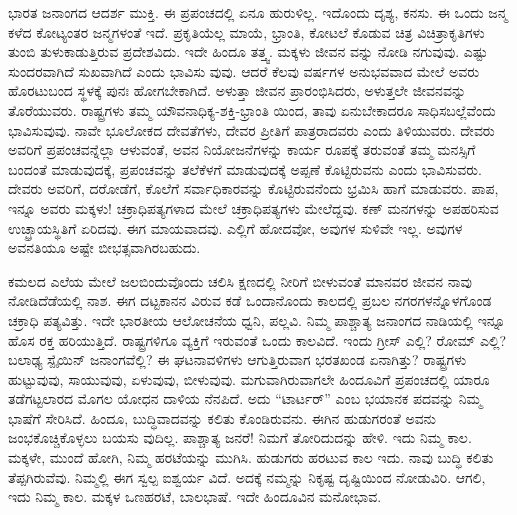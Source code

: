 ಭಾರತ ಜನಾಂಗದ ಆದರ್ಶ ಮುಕ್ತಿ. ಈ ಪ್ರಪಂಚದಲ್ಲಿ ಏನೂ ಹುರುಳಿಲ್ಲ. ಇದೊಂದು ದೃಶ್ಯ, ಕನಸು. ಈ ಒಂದು ಜನ್ಮ ಕಳೆದ ಕೋಟ್ಯಂತರ ಜನ್ಮಗಳಂತೆ ಇದೆ. ಪ್ರಕೃತಿಯೆಲ್ಲ ಮಾಯೆ, ಭ್ರಾಂತಿ, ಕೋಟಲೆ ಕೊಡುವ ಚಿತ್ರ ವಿಚಿತ್ರಾಕೃತಿಗಳು ತುಂಬಿ ತುಳುಕಾಡುತ್ತಿರುವ ಪ್ರದೇಶವಿದು. ಇದೇ ಹಿಂದೂ ತತ್ತ್ವ. ಮಕ್ಕಳು ಜೀವನ ವನ್ನು ನೋಡಿ ನಗುವುವು. ಎಷ್ಟು ಸುಂದರವಾಗಿದೆ ಸುಖವಾಗಿದೆ ಎಂದು ಭಾವಿಸು ವುವು. ಆದರೆ ಕೆಲವು ವರ್ಷಗಳ ಅನುಭವವಾದ ಮೇಲೆ ಅವರು ಹೊರಟುಬಂದ ಸ್ಥಳಕ್ಕೆ ಪುನಃ ಹೋಗಬೇಕಾಗಿದೆ. ಅಳುತ್ತಾ ಜೀವನ ಪ್ರಾರಂಭಿಸಿದರು, ಅಳುತ್ತಲೇ ಜೀವನವನ್ನು ತೊರೆಯುವರು. ರಾಷ್ಟ್ರಗಳು ತಮ್ಮ ಯೌವನಾಧಿಕ್ಯ-ಶಕ್ತಿ-ಭ್ರಾಂತಿ ಯಿಂದ, ತಾವು ಏನುಬೇಕಾದರೂ ಸಾಧಿಸಬಲ್ಲೆವೆಂದು ಭಾವಿಸುವುವು. ನಾವೇ ಭೂಲೋಕದ ದೇವತೆಗಳು, ದೇವರ ಪ್ರೀತಿಗೆ ಪಾತ್ರರಾದವರು ಎಂದು ತಿಳಿಯುವರು. ದೇವರು ಅವರಿಗೆ ಪ್ರಪಂಚವನ್ನೆಲ್ಲಾ ಆಳುವಂತೆ, ಅವನ ನಿಯೋಜನೆಗಳನ್ನು ಕಾರ್ಯ ರೂಪಕ್ಕೆ ತರುವಂತೆ ತಮ್ಮ ಮನಸ್ಸಿಗೆ ಬಂದಂತೆ ಮಾಡುವುದಕ್ಕೆ, ಪ್ರಪಂಚವನ್ನು ತಲೆಕೆಳಗೆ ಮಾಡುವುದಕ್ಕೆ ಅಪ್ಪಣೆ ಕೊಟ್ಟಿರುವನು ಎಂದು ಭಾವಿಸುವರು. ದೇವರು ಅವರಿಗೆ, ದರೋಡೆಗೆ, ಕೊಲೆಗೆ ಸರ್ವಾಧಿಕಾರವನ್ನು ಕೊಟ್ಟಿರುವನೆಂದು ಭ್ರಮಿಸಿ ಹಾಗೆ ಮಾಡುವರು. ಪಾಪ, ಇನ್ನೂ ಅವರು ಮಕ್ಕಳು! ಚಕ್ರಾಧಿಪತ್ಯಗಳಾದ ಮೇಲೆ ಚಕ್ರಾಧಿಪತ್ಯಗಳು ಮೇಲೆದ್ದವು. ಕಣ್​ ಮನಗಳನ್ನು ಅಪಹರಿಸುವ ಉಚ್ಛ್ರಾಯಸ್ಥಿತಿಗೆ ಏರಿದವು. ಈಗ ಮಾಯವಾದವು. ಎಲ್ಲಿಗೆ ಹೋದವೋ, ಅವುಗಳ ಸುಳಿವೇ ಇಲ್ಲ. ಅವುಗಳ ಅವನತಿಯೂ ಅಷ್ಟೇ ಬೀಭತ್ಸವಾಗಿರಬಹುದು.

ಕಮಲದ ಎಲೆಯ ಮೇಲೆ ಜಲಬಿಂದುವೊಂದು ಚಲಿಸಿ ಕ್ಷಣದಲ್ಲಿ ನೀರಿಗೆ ಬೀಳುವಂತೆ ಮಾನವರ ಜೀವನ ನಾವು ನೋಡಿದೆಡೆಯಲ್ಲಿ ನಾಶ. ಈಗ ದಟ್ಟಕಾನನ ವಿರುವ ಕಡೆ ಒಂದಾನೊಂದು ಕಾಲದಲ್ಲಿ ಪ್ರಬಲ ನಗರಗಳನ್ನೊಳಗೊಂಡ ಚಕ್ರಾಧಿ ಪತ್ಯವಿತ್ತು. ಇದೇ ಭಾರತೀಯ ಆಲೋಚನೆಯ ಧ್ವನಿ, ಪಲ್ಲವಿ. ನಿಮ್ಮ ಪಾಶ್ಚಾತ್ಯ ಜನಾಂಗದ ನಾಡಿಯಲ್ಲಿ ಇನ್ನೂ ಹೊಸ ರಕ್ತ ಹರಿಯುತ್ತಿದೆ. ರಾಷ್ಟ್ರಗಳಿಗೂ ವ್ಯಕ್ತಿಗೆ ಇರುವಂತೆ ಒಂದು ಕಾಲವಿದೆ. ಇಂದು ಗ್ರೀಸ್​ ಎಲ್ಲಿ? ರೋಮ್​ ಎಲ್ಲಿ? ಬಲಾಢ್ಯ ಸ್ಪೈಯಿನ್​ ಜನಾಂಗವೆಲ್ಲಿ? ಈ ಘಟನಾವಳಿಗಳು ಆಗುತ್ತಿರುವಾಗ ಭರತಖಂಡ ಏನಾಗಿತ್ತು? ರಾಷ್ಟ್ರಗಳು ಹುಟ್ಟುವುವು, ಸಾಯುವುವು, ಏಳುವುವು, ಬೀಳುವುವು. ಮಗುವಾಗಿರುವಾಗಲೇ ಹಿಂದೂವಿಗೆ ಪ್ರಪಂಚದಲ್ಲಿ ಯಾರೂ ತಡೆಗಟ್ಟಲಾರದ ಮೊಗಲ ಯೋಧನ ದಾಳಿಯ ನೆನಪಿದೆ. ಅದು “ಟಾರ್ಟರ್​” ಎಂಬ ಭಯಾನಕ ಪದವನ್ನು ನಿಮ್ಮ ಭಾಷೆಗೆ ಸೇರಿಸಿದೆ. ಹಿಂದೂ, ಬುದ್ಧಿವಾದವನ್ನು ಕಲಿತು ಕೊಂಡಿರುವನು. ಈಗಿನ ಹುಡುಗರಂತೆ ಅವನು ಜಂಭಕೊಚ್ಚಿಕೊಳ್ಳಲು ಬಯಸು ವುದಿಲ್ಲ. ಪಾಶ್ಚಾತ್ಯ ಜನರೆ! ನಿಮಗೆ ತೋರಿದುದನ್ನು ಹೇಳಿ. ಇದು ನಿಮ್ಮ ಕಾಲ. ಮಕ್ಕಳೇ, ಮುಂದೆ ಹೋಗಿ, ನಿಮ್ಮ ಹರಟೆಯನ್ನು ಮುಗಿಸಿ. ಹುಡುಗರು ಹರಟುವ ಕಾಲ ಇದು. ನಾವು ಬುದ್ಧಿ ಕಲಿತು ತೆಪ್ಪಗಿರುವೆವು. ನಿಮ್ಮಲ್ಲಿ ಈಗ ಸ್ವಲ್ಪ ಐಶ್ವರ್ಯ ವಿದೆ. ಅದಕ್ಕೆ ನಮ್ಮನ್ನು ನಿಕೃಷ್ಟ ದೃಷ್ಟಿಯಿಂದ ನೋಡುವಿರಿ. ಆಗಲಿ, ಇದು ನಿಮ್ಮ ಕಾಲ. ಮಕ್ಕಳ ಒಣಹರಟೆ, ಬಾಲಭಾಷೆ. ಇದೇ ಹಿಂದೂವಿನ ಮನೋಭಾವ.

